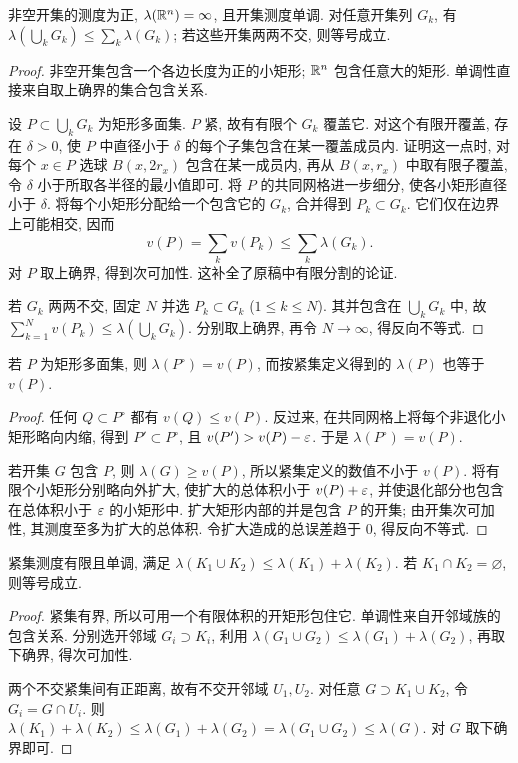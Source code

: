 \begin{proposition}\label{ra:c3:openproperties}
非空开集的测度为正, $\lambda(\mathbb R^n)=\infty$, 且开集测度单调. 对任意开集列 $G_k$, 有 $\lambda(\bigcup_kG_k)\le\sum_k\lambda(G_k)$; 若这些开集两两不交, 则等号成立.
\end{proposition}
\begin{proof}
非空开集包含一个各边长度为正的小矩形; $\mathbb R^n$ 包含任意大的矩形. 单调性直接来自取上确界的集合包含关系.

设 $P\subset\bigcup_kG_k$ 为矩形多面集. $P$ 紧, 故有有限个 $G_k$ 覆盖它. 对这个有限开覆盖, 存在 $\delta>0$, 使 $P$ 中直径小于 $\delta$ 的每个子集包含在某一覆盖成员内. 证明这一点时, 对每个 $x\in P$ 选球 $B(x,2r_x)$ 包含在某一成员内, 再从 $B(x,r_x)$ 中取有限子覆盖, 令 $\delta$ 小于所取各半径的最小值即可. 将 $P$ 的共同网格进一步细分, 使各小矩形直径小于 $\delta$. 将每个小矩形分配给一个包含它的 $G_k$, 合并得到 $P_k\subset G_k$. 它们仅在边界上可能相交, 因而
\[
 v(P)=\sum_kv(P_k)\le\sum_k\lambda(G_k).
\]
对 $P$ 取上确界, 得到次可加性. 这补全了原稿中有限分割的论证.

若 $G_k$ 两两不交, 固定 $N$ 并选 $P_k\subset G_k$ ($1\le k\le N$). 其并包含在 $\bigcup_kG_k$ 中, 故 $\sum_{k=1}^Nv(P_k)\le\lambda(\bigcup_kG_k)$. 分别取上确界, 再令 $N\to\infty$, 得反向不等式.
\end{proof}

\begin{lemma}\label{ra:c3:consistency}
若 $P$ 为矩形多面集, 则 $\lambda(P^\circ)=v(P)$, 而按紧集定义得到的 $\lambda(P)$ 也等于 $v(P)$.
\end{lemma}
\begin{proof}
任何 $Q\subset P^\circ$ 都有 $v(Q)\le v(P)$. 反过来, 在共同网格上将每个非退化小矩形略向内缩, 得到 $P'\subset P^\circ$, 且 $v(P')>v(P)-\varepsilon$. 于是 $\lambda(P^\circ)=v(P)$.

若开集 $G$ 包含 $P$, 则 $\lambda(G)\ge v(P)$, 所以紧集定义的数值不小于 $v(P)$. 将有限个小矩形分别略向外扩大, 使扩大的总体积小于 $v(P)+\varepsilon$, 并使退化部分也包含在总体积小于 $\varepsilon$ 的小矩形中. 扩大矩形内部的并是包含 $P$ 的开集; 由开集次可加性, 其测度至多为扩大的总体积. 令扩大造成的总误差趋于 $0$, 得反向不等式.
\end{proof}

\begin{proposition}\label{ra:c3:compactproperties}
紧集测度有限且单调, 满足 $\lambda(K_1\cup K_2)\le\lambda(K_1)+\lambda(K_2)$. 若 $K_1\cap K_2=\varnothing$, 则等号成立.
\end{proposition}
\begin{proof}
紧集有界, 所以可用一个有限体积的开矩形包住它. 单调性来自开邻域族的包含关系. 分别选开邻域 $G_i\supset K_i$, 利用 $\lambda(G_1\cup G_2)\le\lambda(G_1)+\lambda(G_2)$, 再取下确界, 得次可加性.

两个不交紧集间有正距离, 故有不交开邻域 $U_1,U_2$. 对任意 $G\supset K_1\cup K_2$, 令 $G_i=G\cap U_i$. 则 $\lambda(K_1)+\lambda(K_2)\le\lambda(G_1)+\lambda(G_2)=\lambda(G_1\cup G_2)\le\lambda(G)$. 对 $G$ 取下确界即可.
\end{proof}

